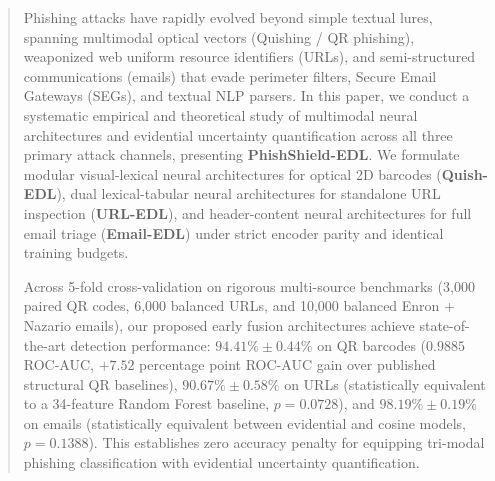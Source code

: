 \documentclass[conference]{IEEEtran}
\begin{document}
\begin{abstract}
Phishing attacks have rapidly evolved beyond simple textual lures, spanning multimodal optical vectors (Quishing / QR phishing), weaponized web uniform resource identifiers (URLs), and semi-structured communications (emails) that evade perimeter filters, Secure Email Gateways (SEGs), and textual NLP parsers. In this paper, we conduct a systematic empirical and theoretical study of multimodal neural architectures and evidential uncertainty quantification across all three primary attack channels, presenting \textbf{PhishShield-EDL}. We formulate modular visual-lexical neural architectures for optical 2D barcodes (\textbf{Quish-EDL}), dual lexical-tabular neural architectures for standalone URL inspection (\textbf{URL-EDL}), and header-content neural architectures for full email triage (\textbf{Email-EDL}) under strict encoder parity and identical training budgets.

Across 5-fold cross-validation on rigorous multi-source benchmarks (3,000 paired QR codes, 6,000 balanced URLs, and 10,000 balanced Enron + Nazario emails), our proposed early fusion architectures achieve state-of-the-art detection performance: $94.41\% \pm 0.44\%$ on QR barcodes ($0.9885$ ROC-AUC, $+7.52$ percentage point ROC-AUC gain over published structural QR baselines), $90.67\% \pm 0.58\%$ on URLs (statistically equivalent to a 34-feature Random Forest baseline, $p = 0.0728$), and $98.19\% \pm 0.19\%$ on emails (statistically equivalent between evidential and cosine models, $p = 0.1388$). This establishes zero accuracy penalty for equipping tri-modal phishing classification with evidential uncertainty quantification.


\end{abstract}
\end{document}
